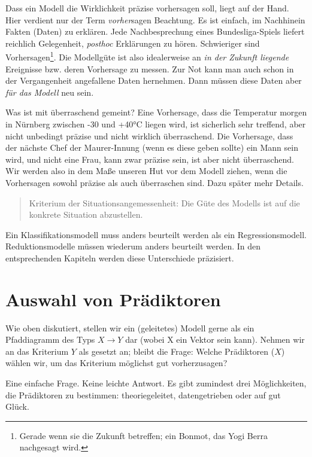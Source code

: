 \documentclass[12pt,ngerman,]{book}
\let\rmarkdownfootnote\footnote%
\def\footnote{\protect\rmarkdownfootnote}
\begin{document}
Dass ein Modell die Wirklichkeit präzise vorhersagen soll, liegt auf der
Hand. Hier verdient nur der Term \emph{vorher}sagen Beachtung. Es ist
einfach, im Nachhinein Fakten (Daten) zu erklären. Jede Nachbesprechung
eines Bundesliga-Spiels liefert reichlich Gelegenheit, \emph{posthoc}
Erklärungen zu hören. Schwieriger sind Vorhersagen\footnote{Gerade wenn
  sie die Zukunft betreffen; ein Bonmot, das Yogi Berra nachgesagt wird.}.
Die Modellgüte ist also idealerweise an \emph{in der Zukunft liegende}
Ereignisse bzw. deren Vorhersage zu messen. Zur Not kann man auch schon
in der Vergangenheit angefallene Daten hernehmen. Dann müssen diese
Daten aber \emph{für das Modell} neu sein.

Was ist mit überraschend gemeint? Eine Vorhersage, dass die Temperatur
morgen in Nürnberg zwischen -30 und +40°C liegen wird, ist sicherlich
sehr treffend, aber nicht unbedingt präzise und nicht wirklich
überraschend. Die Vorhersage, dass der nächste Chef der Maurer-Innung
(wenn es diese geben sollte) ein Mann sein wird, und nicht eine Frau,
kann zwar präzise sein, ist aber nicht überraschend. Wir werden also in
dem Maße unseren Hut vor dem Modell ziehen, wenn die Vorhersagen sowohl
präzise als auch überraschen sind. Dazu später mehr Details.

\begin{quote}
Kriterium der Situationsangemessenheit: Die Güte des Modells ist auf die
konkrete Situation abzustellen.
\end{quote}

Ein Klassifikationsmodell muss anders beurteilt werden als ein
Regressionsmodell. Reduktionsmodelle müssen wiederum anders beurteilt
werden. In den entsprechenden Kapiteln werden diese Unterschiede
präzisiert.

\section{Auswahl von Prädiktoren}\label{auswahl-von-pradiktoren}

Wie oben diskutiert, stellen wir ein (geleitetes) Modell gerne als ein
Pfaddiagramm des Typs \(X \rightarrow Y\) dar (wobei X ein Vektor sein
kann). Nehmen wir an das Kriterium \(Y\) als gesetzt an; bleibt die
Frage: Welche Prädiktoren (\(X\)) wählen wir, um das Kriterium möglichst
gut vorherzusagen?

Eine einfache Frage. Keine leichte Antwort. Es gibt zumindest drei
Möglichkeiten, die Prädiktoren zu bestimmen: theoriegeleitet,
datengetrieben oder auf gut Glück.
\end{document}
